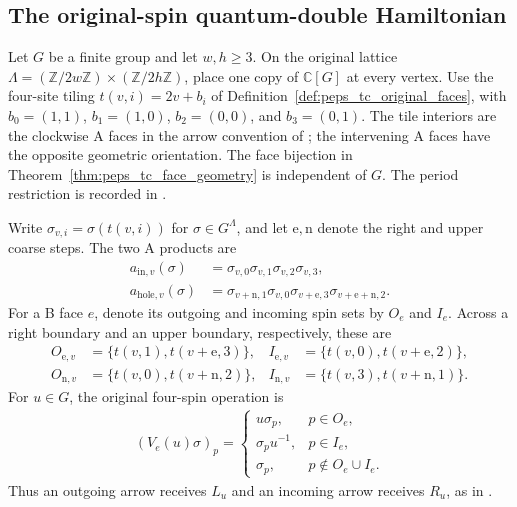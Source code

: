\subsection{The original-spin quantum-double Hamiltonian}
\label{sec:peps_qd_original_spins}

Let $G$ be a finite group and let $w,h\ge3$.
On the original lattice
$\Lambda=(\mathbb Z/2w\mathbb Z)\times(\mathbb Z/2h\mathbb Z)$,
place one copy of $\mathbb C[G]$ at every vertex.
Use the four-site tiling $t(v,i)=2v+b_i$ of
Definition~\ref{def:peps_tc_original_faces}, with
$b_0=(1,1)$, $b_1=(1,0)$, $b_2=(0,0)$, and $b_3=(0,1)$.
The tile interiors are the clockwise A faces in the arrow convention of
\cite[Section~7.2]{Schuch2010PEPS}; the intervening A faces have the
opposite geometric orientation. The face bijection in
Theorem~\ref{thm:peps_tc_face_geometry} is independent of $G$.
The period restriction is recorded in
\cite{gap:rmp_peps_examples_small_torus}.

\begin{definition}
    \label{def:peps_qd_original_actions}
    \leanok
    Write $\sigma_{v,i}=\sigma(t(v,i))$ for $\sigma\in G^\Lambda$,
    and let $\mathrm e,\mathrm n$ denote the right and upper coarse steps.
    The two A products are
    \begin{align}
        a_{\mathrm{in},v}(\sigma)
          &=\sigma_{v,0}\sigma_{v,1}\sigma_{v,2}\sigma_{v,3},\\
        a_{\mathrm{hole},v}(\sigma)
          &=\sigma_{v+\mathrm n,1}\sigma_{v,0}
            \sigma_{v+\mathrm e,3}\sigma_{v+\mathrm e+\mathrm n,2}.
        \label{eq:peps_qd_original_a}
    \end{align}
    For a B face $e$, denote its outgoing and incoming spin sets by
    $O_e$ and $I_e$. Across a right boundary and an upper boundary,
    respectively, these are
    \begin{align}
        O_{\mathrm e,v}&=\{t(v,1),t(v+\mathrm e,3)\},&
        I_{\mathrm e,v}&=\{t(v,0),t(v+\mathrm e,2)\},\\
        O_{\mathrm n,v}&=\{t(v,0),t(v+\mathrm n,2)\},&
        I_{\mathrm n,v}&=\{t(v,3),t(v+\mathrm n,1)\}.
        \label{eq:peps_qd_original_incidence}
    \end{align}
    For $u\in G$, the original four-spin operation is
    \begin{align}
        (V_e(u)\sigma)_p=
        \begin{cases}
            u\sigma_p,&p\in O_e,\\
            \sigma_pu^{-1},&p\in I_e,\\
            \sigma_p,&p\notin O_e\cup I_e.
        \end{cases}
        \label{eq:peps_qd_original_action}
    \end{align}
    Thus an outgoing arrow receives $L_u$ and an incoming arrow receives
    $R_u$, as in \cite[Section~7.2]{Schuch2010PEPS}.
\end{definition}


